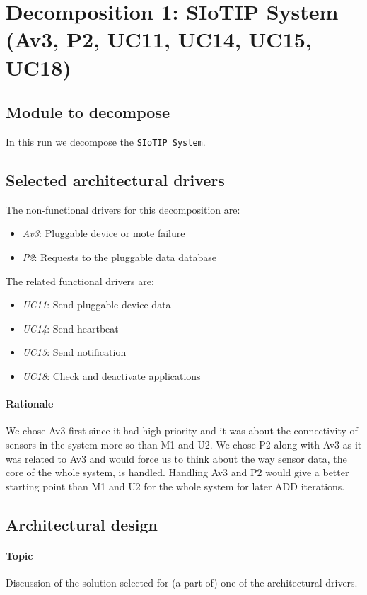 \section{Decomposition 1: SIoTIP System (Av3, P2, UC11, UC14, UC15, UC18)}
\subsection{Module to decompose}
In this run we decompose the \texttt{SIoTIP System}.

\subsection{Selected architectural drivers}
The non-functional drivers for this decomposition are:

\begin{itemize}
	\item \emph{Av3}: Pluggable device or mote failure
	\item \emph{P2}: Requests to the pluggable data database
\end{itemize}

The related functional drivers are:

\begin{itemize}
    \item \emph{UC11}: Send pluggable device data
	\item \emph{UC14}: Send heartbeat
	\item \emph{UC15}: Send notification
	\item \emph{UC18}: Check and deactivate applications
\end{itemize}

\paragraph{Rationale}
We chose Av3 first since it had high priority and it was about the connectivity
of sensors in the system more so than M1 and U2. We
chose P2 along with Av3 as it was related to Av3 and would force us to think
about the way sensor data, the core of the whole system, is handled.
Handling Av3 and P2 would give a better starting point than M1 and U2
for the whole system for later ADD iterations.

\subsection{Architectural design}
\paragraph{Topic}
Discussion of the solution selected for (a part of) one of the architectural
drivers.


